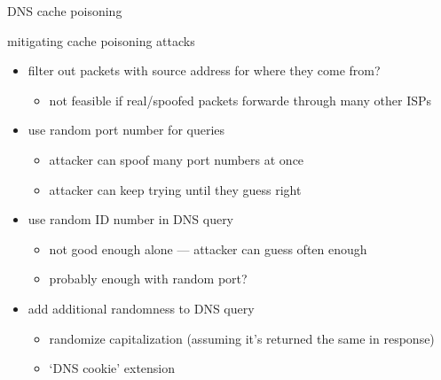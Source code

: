 \begin{frame}{DNS cache poisoning}
\end{frame}

\begin{frame}{mitigating cache poisoning attacks}
    \begin{itemize}
    \item filter out packets with source address for where they come from?
        \begin{itemize}
        \item not feasible if real/spoofed packets forwarde through many other ISPs
        \end{itemize}
    \item use random port number for queries
        \begin{itemize}
        \item attacker can spoof many port numbers at once
        \item attacker can keep trying until they guess right
        \end{itemize}
    \item use random ID number in DNS query
        \begin{itemize}
        \item not good enough alone --- attacker can guess often enough
        \item probably enough with random port?
        \end{itemize}
    \item add additional randomness to DNS query
        \begin{itemize}
        \item randomize capitalization (assuming it's returned the same in response)
        \item `DNS cookie' extension 
        \end{itemize}
    \end{itemize}
\end{frame}
